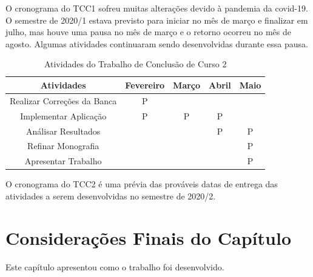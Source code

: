 O cronograma do TCC1 sofreu muitas alterações devido à pandemia da covid-19. O semestre de 2020/1 estava previsto para iniciar no mês de março e finalizar em julho, mas houve uma pausa no 
mês de março e o retorno ocorreu no mês de agosto. Algumas atividades continuaram sendo desenvolvidas durante essa pausa.



\begin{table}[ht]
	\centering
	\caption{Atividades do Trabalho de Conclusão de Curso 2}
	\label{tab05}
	
	\begin{tabular}{ccccc}
		\toprule
		\textbf{Atividades} & \textbf{Fevereiro} & 
		\textbf{Março}  & \textbf{Abril}& \textbf{Maio}\\
		\midrule
		\begin{minipage} [t] {0.2\textwidth} \centering Realizar Correções da Banca \end{minipage} & P &  &  &  \\
		\midrule
		\begin{minipage} [t] {0.2\textwidth} \centering Implementar Aplicação \end{minipage} & P & P & P &  \\
		\midrule
		\begin{minipage} [t] {0.2\textwidth} \centering Análisar Resultados \end{minipage} &  &  &P &P  \\
		\midrule
		\begin{minipage} [t] {0.2\textwidth} \centering Refinar Monografia \end{minipage} &  &  &  & P \\
		\midrule
		\begin{minipage} [t] {0.2\textwidth} \centering Apresentar Trabalho \end{minipage} &  & & & P \\
		\bottomrule
	\end{tabular}
\end{table}

O cronograma do TCC2 é uma prévia das prováveis datas de entrega das atividades a serem desenvolvidas no semestre de 2020/2.

\section{Considerações Finais do Capítulo}

Este capítulo apresentou como o trabalho foi desenvolvido.

